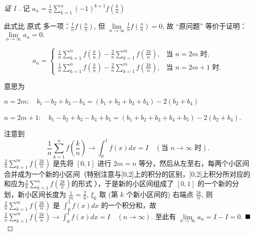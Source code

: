 \documentclass[lang=cn,newtx,10pt,scheme=chinese]{elegantbook}
\begin{document}
\begin{proof}[证 I ]
记 $a_n = \frac{1}{n} \sum\limits_{k=1}^{n} (-1)^{k+1} f\left(\frac{k}{n}\right) \quad$

此式比 原式 多一项：$\frac{1}{n} f\left(\frac{n}{n}\right)$, 但 $\lim\limits_{n \to \infty} \frac{1}{n} f\left(\frac{n}{n}\right) = 0$, 故 “原问题” 等价于证明：
$ \lim\limits_{n \to \infty} a_n = 0. $

$$\boxed{a_n = \begin{cases} \frac{1}{n} \sum\limits_{k=1}^{n} f\left(\frac{k}{n}\right) - \frac{2}{n} \sum\limits_{k=1}^{m} f\left(\frac{2k}{n}\right), & \text{当 } n=2m \text{ 时,} \\ \frac{1}{n} \sum\limits_{k=1}^{n} f\left(\frac{k}{n}\right) - \frac{2}{n} \sum\limits_{k=1}^{m} f\left(\frac{2k}{n}\right), & \text{当 } n=2m+1 \text{ 时.} \end{cases}}$$

\begin{remark}
意思为

$n=2m : \quad b_1 - b_2 + b_3 - b_4 = (b_1+b_2+b_3+b_4) - 2(b_2+b_4)$

$n=2m+1 : \quad b_1 - b_2 + b_3 - b_4 + b_5 = (b_1+b_2+b_3+b_4+b_5) - 2(b_2+b_4)$. 
\end{remark}
注意到
$$ \frac{1}{n} \sum_{k=1}^{n} f\left(\frac{k}{n}\right) \to \int_0^1 f(x) dx = I \quad (\text{当 } n \to \infty \text{ 时}). $$
$\frac{2}{n} \sum\limits_{k=1}^{m} f\left(\frac{2k}{n}\right)$ 是先将 $[0,1]$ 进行 $2m=n$ 等分，然后从左至右，每两个小区间合并成为一个新的小区间（特别注意与[0,2]上的积分的区别，[0,2]上积分所对应的和应为$\frac{2}{n} \sum\limits_{k=1}^{n} f\left(\frac{2k}{n}\right)$的形式 ），于是新的小区间组成了 $[0,1]$ 的一个新的分划，新小区间长度为 $\frac{1}{m} = \frac{2}{n}$, $\xi_k$ 取 (第 $k$ 个新小区间的) 右端点 $\frac{2k}{n}$, 则 $\frac{2}{n} \sum\limits_{k=1}^{m} f\left(\frac{2k}{n}\right)$ 是 $\int_0^1 f(x) dx$ 的一个积分和，故 $\frac{2}{n} \sum\limits_{k=1}^{m} f\left(\frac{2k}{n}\right) \to \int_0^1 f(x) dx = I \quad (n \to \infty)$. 至此有 $\lim\limits_{n \to \infty} a_n = I - I = 0$. $\hfill \blacksquare$
\end{proof}
\end{document}
